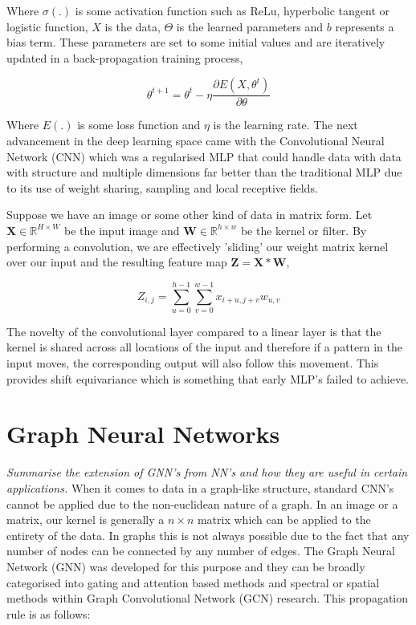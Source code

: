 \documentclass[honours,12pt]{unswthesis}
\numberwithin{equation}{section}
\begin{document}
\noindent Where $\sigma(.)$ is some activation function such as ReLu, hyperbolic tangent or logistic function, $X$ is the data, $\Theta$ is the learned parameters and $b$ represents a bias term.
These parameters are set to some initial values and are iteratively updated in a back-propagation training process,

\begin{equation}
    \theta^{t+1} = \theta^{t} - \eta\frac{\partial E(X, \theta^t)}{\partial\theta}
\end{equation}

\noindent Where $E(.)$ is some loss function and $\eta$ is the learning rate.
The next advancement in the deep learning space came with the Convolutional Neural Network (CNN) which was a regularised MLP that could
handle data with data with structure and multiple dimensions far better than the traditional MLP due to its use of weight sharing, sampling
and local receptive fields.\cite{Goodfellow-et-al-2016}

\noindent Suppose we have an image or some other kind of data in matrix form. Let $\textbf{X} \in \mathbb{R}^{H\times W}$ be the input image and
$\textbf{W} \in \mathbb{R}^{h\times w}$ be the kernel or filter. By performing a convolution, we are effectively 'sliding' our weight matrix kernel
over our input and the resulting feature map $\textbf{Z} = \textbf{X} \ast \textbf{W}$,

\begin{equation}
    Z_{i, j} = \sum_{u=0}^{h-1}\sum_{v=0}^{w-1} x_{i+u, j+v} w_{u, v}
\end{equation}

\noindent The novelty of the convolutional layer compared to a linear layer is that the kernel is shared across all locations of the input and therefore
if a pattern in the input moves, the corresponding output will also follow this movement. This provides shift equivariance which is something that early MLP's
failed to achieve.\cite{pml1Book}

\section{Graph Neural Networks}\label{gnn}
\textit{Summarise the extension of GNN's from NN's and how they are useful in certain applications.} 
When it comes to data in a graph-like structure, standard CNN's cannot be applied due to the non-euclidean nature of a graph.
In an image or a matrix, our kernel is generally a $n\times n$ matrix which can be applied to the entirety of the data. In graphs
this is not always possible due to the fact that any number of nodes can be connected by any number of edges.\cite{sanchez-lengeling2021a} 
The Graph Neural Network (GNN) was developed for this purpose and they can be broadly categorised into gating and attention based methods\cite{veličković2018graph} 
and spectral or spatial methods within Graph Convolutional Network (GCN) research.\cite{kipf2017semisupervised} This propagation rule is as follows:
\end{document}
